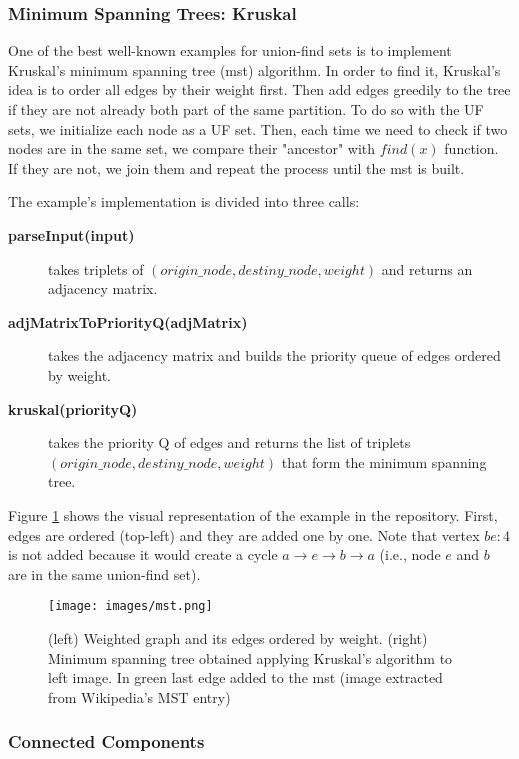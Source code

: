 \documentclass[a4paper,10pt,table,xcdraw]{article}
\begin{document}
\subsubsection{Minimum Spanning Trees: Kruskal}

One of the best well-known examples for union-find sets is to implement Kruskal's minimum spanning tree (mst) algorithm. In order to find it, Kruskal's idea is to order all edges by their weight first. Then add edges greedily to the tree if they are not already both part of the same partition. To do so with the UF sets, we initialize each node as a UF set. Then, each time we need to check if two nodes are in the same set, we compare their "ancestor" with $find(x)$ function. If they are not, we join them and repeat the process until the mst is built.

The example's implementation is divided into three calls:

\begin{description}
\item [\textbf{parseInput(input)}] takes triplets of $(origin\_node, destiny\_node, weight)$ and returns an adjacency matrix.
\item [\textbf{adjMatrixToPriorityQ(adjMatrix)}] takes the adjacency matrix and builds the priority queue of edges ordered by weight.
\item [\textbf{kruskal(priorityQ)}] takes the priority Q of edges and returns the list of triplets $(origin\_node, destiny\_node, weight)$ that form the minimum spanning tree.
\end{description}

Figure \ref{fig:mst} shows the visual representation of the example in the repository. First, edges are ordered (top-left) and they are added one by one. Note that vertex $be: 4$ is not added because it would create a cycle $a \rightarrow e \rightarrow b \rightarrow a$ (i.e., node $e$ and $b$ are in the same union-find set).

\begin{figure}[H]
\centering
\texttt{[image: images/mst.png]}
\caption{ (left) Weighted graph and its edges ordered by weight. (right) Minimum spanning tree obtained applying Kruskal's algorithm to left image. In green last edge added to the mst (image extracted from Wikipedia's MST entry)}
\label{fig:mst}
\end{figure}

\subsubsection{Connected Components}
\end{document}
